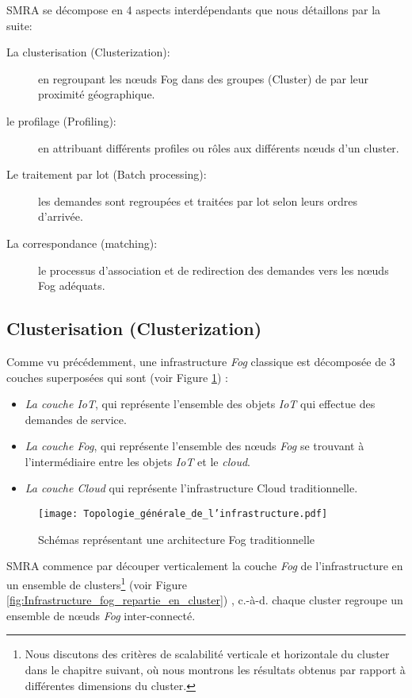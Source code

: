 SMRA se décompose en 4 aspects interdépendants que nous détaillons par la suite:


\begin{description}
  \item[La clusterisation (Clusterization):] en regroupant les nœuds Fog dans des groupes (Cluster) de par leur proximité géographique.
  \item[le profilage (Profiling):] en attribuant différents profiles ou rôles aux différents nœuds d'un cluster.
  \item[Le traitement par lot (Batch processing):] les demandes sont regroupées et traitées par lot selon leurs ordres d'arrivée.
  \item[La correspondance (matching):] le processus d'association et de redirection des demandes vers les nœuds Fog adéquats.
\end{description}



\subsection{Clusterisation (Clusterization)}


Comme vu précédemment, une infrastructure \emph{Fog} classique est décomposée de 3 couches superposées qui sont (voir Figure \ref{fig:Topologie_generale_de_linfrastructure}) :


\begin{itemize}
    \item \emph{La couche IoT}, qui représente l'ensemble des objets \emph{IoT} qui effectue des demandes de service.
    \item \emph{La couche Fog}, qui représente l'ensemble des nœuds \emph{Fog} se trouvant à l'intermédiaire entre les objets \emph{IoT} et le \emph{cloud}.
    \item \emph{La couche Cloud} qui représente l'infrastructure Cloud traditionnelle.
\end{itemize}


\begin{figure}[H]
    \centering
    \texttt{[image: Topologie\_générale\_de\_l'infrastructure.pdf]}
    \caption{Schémas représentant une architecture Fog traditionnelle}
    \label{fig:Topologie_generale_de_linfrastructure}
\end{figure}


\par SMRA commence par découper verticalement la couche \emph{Fog} de l'infrastructure en un ensemble de clusters\footnote{Nous discutons des critères de scalabilité verticale et horizontale du cluster dans le chapitre suivant, où nous montrons les résultats obtenus par rapport à différentes dimensions du cluster.} (voir Figure \ref{fig:Infrastructure_fog_repartie_en_cluster}) , c.-à-d. chaque cluster regroupe un ensemble de nœuds \emph{Fog} inter-connecté.


